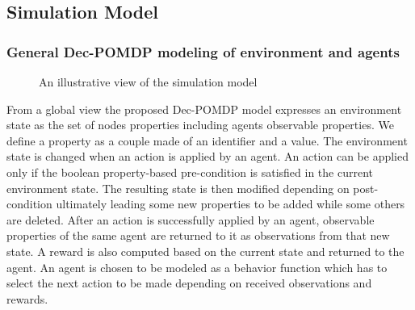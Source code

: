 \subsection{Simulation Model}

\subsubsection{General Dec-POMDP modeling of environment and agents}


\begin{figure*}[]
    \centering
    
    \caption{An illustrative view of the simulation model}
    \label{fig:model_example_illustration}
\end{figure*}

\noindent
From a global view the proposed Dec-POMDP model expresses an environment state as the set of nodes properties including agents observable properties. We define a property as a couple made of an identifier and a value. The environment state is changed when an action is applied by an agent. An action can be applied only if the boolean property-based pre-condition is satisfied in the current environment state. The resulting state is then modified depending on post-condition ultimately leading some new properties to be added while some others are deleted. After an action is successfully applied by an agent, observable properties of the same agent are returned to it as observations from that new state. A reward is also computed based on the current state and returned to the agent. An agent is chosen to be modeled as a behavior function which has to select the next action to be made depending on received observations and rewards.

